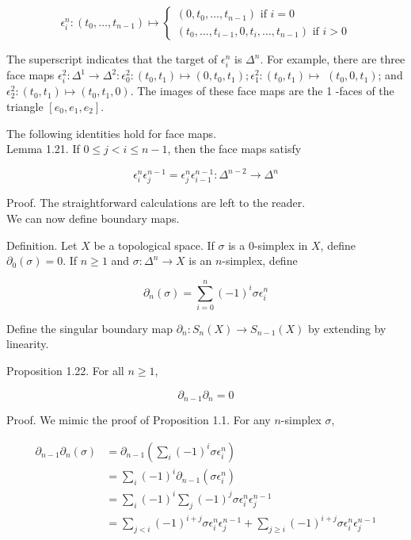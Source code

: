\documentclass[10pt, letterpaper]{article}
\begin{document}
$$
\epsilon_{i}^{n}:\left(t_{0}, \ldots, t_{n-1}\right) \mapsto\left\{\begin{array}{l}
\left(0, t_{0}, \ldots, t_{n-1}\right) \text { if } i=0 \\
\left(t_{0}, \ldots, t_{i-1}, 0, t_{i}, \ldots, t_{n-1}\right) \text { if } i>0
\end{array}\right.
$$

The superscript indicates that the target of $\epsilon_{i}^{n}$ is $\Delta^{n}$. For example, there are three face maps $\epsilon_{i}^{2}: \Delta^{1} \rightarrow \Delta^{2}: \epsilon_{0}^{2}:\left(t_{0}, t_{1}\right) \mapsto\left(0, t_{0}, t_{1}\right) ; \epsilon_{1}^{2}:\left(t_{0}, t_{1}\right) \mapsto$ $\left(t_{0}, 0, t_{1}\right)$; and $\epsilon_{2}^{2}:\left(t_{0}, t_{1}\right) \mapsto\left(t_{0}, t_{1}, 0\right)$. The images of these face maps are the 1 -faces of the triangle $\left[e_{0}, e_{1}, e_{2}\right]$.

The following identities hold for face maps.\\
Lemma 1.21. If $0 \leq j<i \leq n-1$, then the face maps satisfy

$$
\epsilon_{i}^{n} \epsilon_{j}^{n-1}=\epsilon_{j}^{n} \epsilon_{i-1}^{n-1}: \Delta^{n-2} \rightarrow \Delta^{n}
$$

Proof. The straightforward calculations are left to the reader.\\
We can now define boundary maps.

Definition. Let $X$ be a topological space. If $\sigma$ is a 0-simplex in $X$, define $\partial_{0}(\sigma)=0$. If $n \geq 1$ and $\sigma: \Delta^{n} \rightarrow X$ is an $n$-simplex, define

$$
\partial_{n}(\sigma)=\sum_{i=0}^{n}(-1)^{i} \sigma \epsilon_{i}^{n}
$$

Define the singular boundary map $\partial_{n}: S_{n}(X) \rightarrow S_{n-1}(X)$ by extending by linearity.

Proposition 1.22. For all $n \geq 1$,

$$
\partial_{n-1} \partial_{n}=0
$$

Proof. We mimic the proof of Proposition 1.1. For any $n$-simplex $\sigma$,

$$
\begin{aligned}
\partial_{n-1} \partial_{n}(\sigma) & =\partial_{n-1}\left(\sum_{i}(-1)^{i} \sigma \epsilon_{i}^{n}\right) \\
& =\sum_{i}(-1)^{i} \partial_{n-1}\left(\sigma \epsilon_{i}^{n}\right) \\
& =\sum_{i}(-1)^{i} \sum_{j}(-1)^{j} \sigma \epsilon_{i}^{n} \epsilon_{j}^{n-1} \\
& =\sum_{j<i}(-1)^{i+j} \sigma \epsilon_{i}^{n} \epsilon_{j}^{n-1}+\sum_{j \geq i}(-1)^{i+j} \sigma \epsilon_{i}^{n} \epsilon_{j}^{n-1}
\end{aligned}
$$
\end{document}

